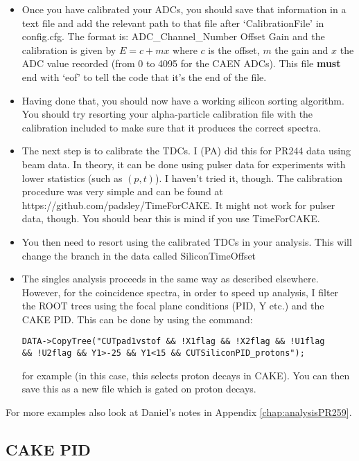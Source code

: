 \documentclass[11pt]{report}
\begin{document}
\begin{itemize}
\item Once you have calibrated your ADCs, you should save that information in a text file and add the relevant path to that file after ‘CalibrationFile’ in config.cfg. The format is: ADC\_Channel\_Number Offset Gain and the calibration is given by $E = c + mx$ where $c$ is the offset, $m$ the gain and $x$ the ADC value recorded (from 0 to 4095 for the CAEN ADCs). This file \textbf{must} end with `eof' to tell the code that it's the end of the file.

\item Having done that, you should now have a working silicon sorting algorithm. You should try resorting your alpha-particle calibration file with the calibration included to make sure that it produces the correct spectra.

\item The next step is to calibrate the TDCs. I (PA) did this for PR244 data using beam data. In theory, it can be done using pulser data for experiments with lower statistics (such as $(p,t)$). I haven't tried it, though. The calibration procedure was very simple and can be found at https://github.com/padsley/TimeForCAKE. It might not work for pulser data, though. You should bear this is mind if you use TimeForCAKE.

\item You then need to resort using the calibrated TDCs in your analysis. This will change the branch in the data called SiliconTimeOffset

\item The singles analysis proceeds in the same way as described elsewhere. However, for the coincidence spectra, in order to speed up analysis, I filter the ROOT trees using the focal plane conditions (PID, Y etc.) and the CAKE PID. This can be done by using the command:

\begin{verbatim}
DATA->CopyTree("CUTpad1vstof && !X1flag && !X2flag && !U1flag
&& !U2flag && Y1>-25 && Y1<15 && CUTSiliconPID_protons");
\end{verbatim}

\noindent for example (in this case, this selects proton decays in CAKE). You can then save this as a new file which is gated on proton decays.


\end{itemize}

For more examples also look at Daniel's notes in Appendix \ref{chap:analysisPR259}.


\subsection{CAKE PID}
\end{document}
